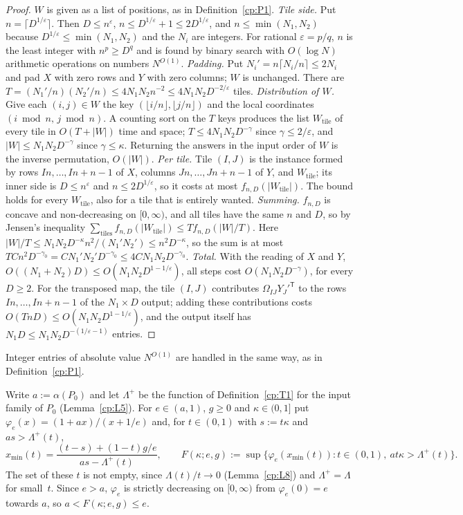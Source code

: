 \documentclass[11pt]{article}
\theoremstyle{definition}
\theoremstyle{remark}
\providecommand{\eps}{\varepsilon}
\newcommand{\abs}[1]{\lvert #1\rvert}
\newcommand{\Lam}{\Lambda}                    %
\newcommand{\Lamp}{\Lambda^{+}}               %
\newcommand{\xmin}{x_{\min}}                  %
\newcommand{\Pzero}{P_0}                      %
\begin{document}
\begin{proof}
$W$ is given as a list of positions, as in Definition~\ref{cp:P1}.
\emph{Tile side.} Put $n=\lceil D^{1/\eps}\rceil$. Then $D\le n^\eps$, $n\le D^{1/\eps}+1\le2D^{1/\eps}$, and $n\le\min(N_1,N_2)$ because $D^{1/\eps}\le\min(N_1,N_2)$ and the $N_i$ are integers. For rational $\eps=p/q$, $n$ is the least integer with $n^p\ge D^q$ and is found by binary search with $O(\log N)$ arithmetic operations on numbers $N^{O(1)}$.
\emph{Padding.} Put $N_i'=n\lceil N_i/n\rceil\le2N_i$ and pad $X$ with zero rows and $Y$ with zero columns; $W$ is unchanged. There are $T=(N_1'/n)(N_2'/n)\le4N_1N_2n^{-2}\le4N_1N_2D^{-2/\eps}$ tiles.
\emph{Distribution of $W$.} Give each $(i,j)\in W$ the key $(\lfloor i/n\rfloor,\lfloor j/n\rfloor)$ and the local coordinates $(i\bmod n,\,j\bmod n)$. A counting sort on the $T$ keys produces the list $W_{\mathrm{tile}}$ of every tile in $O(T+\abs W)$ time and space; $T\le4N_1N_2D^{-\gamma}$ since $\gamma\le2/\eps$, and $\abs W\le N_1N_2D^{-\gamma}$ since $\gamma\le\kappa$. Returning the answers in the input order of $W$ is the inverse permutation, $O(\abs W)$.
\emph{Per tile.} Tile $(I,J)$ is the instance formed by rows $In,\dots,In+n-1$ of $X$, columns $Jn,\dots,Jn+n-1$ of $Y$, and $W_{\mathrm{tile}}$; its inner side is $D\le n^\eps$ and $n\le2D^{1/\eps}$, so it costs at most $f_{n,D}(\abs{W_{\mathrm{tile}}})$. The bound holds for every $W_{\mathrm{tile}}$, also for a tile that is entirely wanted.
\emph{Summing.} $f_{n,D}$ is concave and non-decreasing on $[0,\infty)$, and all tiles have the same $n$ and $D$, so by Jensen's inequality $\sum_{\mathrm{tiles}}f_{n,D}(\abs{W_{\mathrm{tile}}})\le Tf_{n,D}(\abs W/T)$. Here $\abs W/T\le N_1N_2D^{-\kappa}n^2/(N_1'N_2')\le n^2D^{-\kappa}$, so the sum is at most $TCn^2D^{-\gamma_0}=CN_1'N_2'D^{-\gamma_0}\le4CN_1N_2D^{-\gamma_0}$.
\emph{Total.} With the reading of $X$ and $Y$, $O((N_1+N_2)D)\le O(N_1N_2D^{1-1/\eps})$, all steps cost $O(N_1N_2D^{-\gamma})$, for every $D\ge2$. For the transposed map, the tile $(I,J)$ contributes $\Omega_{IJ}Y_J'^{\mathsf T}$ to the rows $In,\dots,In+n-1$ of the $N_1\times D$ output; adding these contributions costs $O(TnD)\le O(N_1N_2D^{1-1/\eps})$, and the output itself has $N_1D\le N_1N_2D^{-(1/\eps-1)}$ entries.
\end{proof}

Integer entries of absolute value $N^{O(1)}$ are handled in the same way, as in Definition~\ref{cp:P1}.

Write $a:=\alpha(\Pzero)$ and let $\Lamp$ be the function of Definition~\ref{cp:T1} for the input family of $\Pzero$ (Lemma~\ref{cp:L5}). For $e\in(a,1)$, $g\ge0$ and $\kappa\in(0,1]$ put $\varphi_e(x)=(1+ax)/(x+1/e)$ and, for $t\in(0,1)$ with $s:=t\kappa$ and $as>\Lamp(t)$,
\[
\xmin(t)=\frac{(t-s)+(1-t)g/e}{as-\Lamp(t)},\qquad F(\kappa;e,g):=\sup\bigl\{\varphi_e(\xmin(t)):t\in(0,1),\ at\kappa>\Lamp(t)\bigr\}.
\]
The set of these $t$ is not empty, since $\Lam(t)/t\to0$ (Lemma~\ref{cp:L8}) and $\Lamp=\Lam$ for small~$t$. Since $e>a$, $\varphi_e$ is strictly decreasing on $[0,\infty)$ from $\varphi_e(0)=e$ towards $a$, so $a<F(\kappa;e,g)\le e$.
\end{document}
